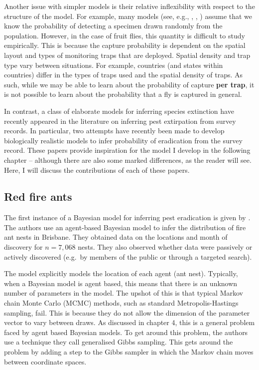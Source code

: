 \documentclass[
  oneside]{book}
\begin{document}
Another issue with simpler models is their relative inflexibility with respect to the structure of the model. For example, many models (see, e.g., \citet{mcardle}, \citet{barnes}, \citet{boakes}) assume that we know the probability of detecting a specimen drawn randomly from the population. However, in the case of fruit flies, this quantity is difficult to study empirically. This is because the capture probability is dependent on the spatial layout and types of monitoring traps that are deployed. Spatial density and trap type vary between situations. For example, countries (and states within countries) differ in the types of traps used and the spatial density of traps. As such, while we may be able to learn about the probability of capture \textbf{per trap}, it is not possible to learn about the probability that a fly is captured in general.

In contrast, a class of elaborate models for inferring species extinction have recently appeared in the literature on inferring pest extirpation from survey records. In particular, two attempts have recently been made to develop biologically realistic models to infer probability of eradication from the survey record. These papers provide inspiration for the model I develop in the following chapter -- although there are also some marked differences, as the reader will see. Here, I will discuss the contributions of each of these papers.

\hypertarget{red-fire-ants}{%
\subsection{Red fire ants}\label{red-fire-ants}}

The first instance of a Bayesian model for inferring pest eradication is given by \citet{keith2013}. The authors use an agent-based Bayesian model to infer the distribution of fire ant nests in Brisbane. They obtained data on the locations and month of discovery for \(n = 7{,}068\) nests. They also observed whether data were passively or actively discovered (e.g.~by members of the public or through a targeted search).

The model explicitly models the location of each agent (ant nest). Typically, when a Bayesian model is agent based, this means that there is an unknown number of parameters in the model. The upshot of this is that typical Markov chain Monte Carlo (MCMC) methods, such as standard Metropolis-Hastings sampling, fail. This is because they do not allow the dimension of the parameter vector to vary between draws. As discussed in chapter 4, this is a general problem faced by agent based Bayesian models. To get around this problem, the authors use a technique they call generalised Gibbs sampling. This gets around the problem by adding a step to the Gibbs sampler in which the Markov chain moves between coordinate spaces.
\end{document}
